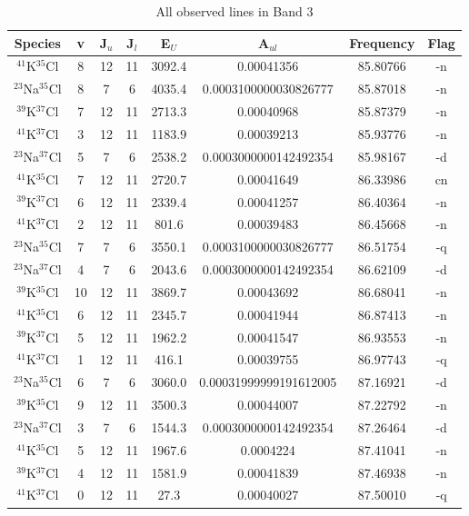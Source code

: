 \begin{table*}[htp]
\centering
\caption{All observed lines in Band 3}
\begin{tabular}{cccccccc}
\label{tab:all_detections_B3}
Species & v & J$_u$ & J$_l$ & E$_U$ & A$_{ul}$ & Frequency & Flag \\
\hline
$^{41}$K$^{35}$Cl & 8 & 12 & 11 & 3092.4 & 0.00041356 & 85.80766 & -n \\
$^{23}$Na$^{35}$Cl & 8 & 7 & 6 & 4035.4 & 0.0003100000030826777 & 85.87018 & -n \\
$^{39}$K$^{37}$Cl & 7 & 12 & 11 & 2713.3 & 0.00040968 & 85.87379 & -n \\
$^{41}$K$^{37}$Cl & 3 & 12 & 11 & 1183.9 & 0.00039213 & 85.93776 & -n \\
$^{23}$Na$^{37}$Cl & 5 & 7 & 6 & 2538.2 & 0.0003000000142492354 & 85.98167 & -d \\
$^{41}$K$^{35}$Cl & 7 & 12 & 11 & 2720.7 & 0.00041649 & 86.33986 & cn \\
$^{39}$K$^{37}$Cl & 6 & 12 & 11 & 2339.4 & 0.00041257 & 86.40364 & -n \\
$^{41}$K$^{37}$Cl & 2 & 12 & 11 & 801.6 & 0.00039483 & 86.45668 & -n \\
$^{23}$Na$^{35}$Cl & 7 & 7 & 6 & 3550.1 & 0.0003100000030826777 & 86.51754 & -q \\
$^{23}$Na$^{37}$Cl & 4 & 7 & 6 & 2043.6 & 0.0003000000142492354 & 86.62109 & -d \\
$^{39}$K$^{35}$Cl & 10 & 12 & 11 & 3869.7 & 0.00043692 & 86.68041 & -n \\
$^{41}$K$^{35}$Cl & 6 & 12 & 11 & 2345.7 & 0.00041944 & 86.87413 & -n \\
$^{39}$K$^{37}$Cl & 5 & 12 & 11 & 1962.2 & 0.00041547 & 86.93553 & -n \\
$^{41}$K$^{37}$Cl & 1 & 12 & 11 & 416.1 & 0.00039755 & 86.97743 & -q \\
$^{23}$Na$^{35}$Cl & 6 & 7 & 6 & 3060.0 & 0.00031999999191612005 & 87.16921 & -d \\
$^{39}$K$^{35}$Cl & 9 & 12 & 11 & 3500.3 & 0.00044007 & 87.22792 & -n \\
$^{23}$Na$^{37}$Cl & 3 & 7 & 6 & 1544.3 & 0.0003000000142492354 & 87.26464 & -d \\
$^{41}$K$^{35}$Cl & 5 & 12 & 11 & 1967.6 & 0.0004224 & 87.41041 & -n \\
$^{39}$K$^{37}$Cl & 4 & 12 & 11 & 1581.9 & 0.00041839 & 87.46938 & -n \\
$^{41}$K$^{37}$Cl & 0 & 12 & 11 & 27.3 & 0.00040027 & 87.50010 & -q \\

\end{tabular}
\end{table*}
